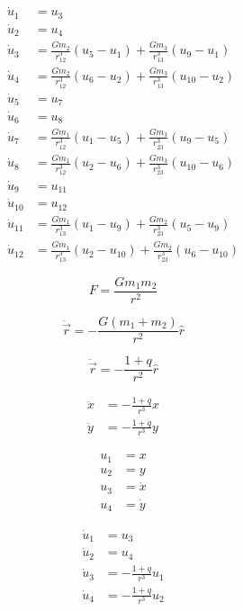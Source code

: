 \documentclass[a4paper,twoside,12pt,hidelinks]{article}
\begin{document}
\begin{align*}
  \dot{u}_1 &= u_3 \\
  \dot{u}_2 &= u_4 \\
  \dot{u}_3 &= \frac{G m_2}{r^3_{12}} (u_5 - u_1)  + \frac{G m_3}{r^3_{13}} (u_9 - u_1) \\
  \dot{u}_4 &= \frac{G m_2}{r^3_{12}} (u_6 - u_2)  + \frac{G m_3}{r^3_{13}} (u_{10} - u_2) \\
  \dot{u}_5 &= u_7 \\
  \dot{u}_6 &= u_8 \\
  \dot{u}_7 &= \frac{G m_1}{r^3_{12}} (u_1 - u_5)  + \frac{G m_3}{r^3_{23}} (u_9 - u_5) \\
  \dot{u}_8 &= \frac{G m_1}{r^3_{12}} (u_2 - u_6)  + \frac{G m_3}{r^3_{23}} (u_{10} - u_6) \\
  \dot{u}_9 &= u_{11} \\
  \dot{u}_{10} &= u_{12} \\
  \dot{u}_{11} &= \frac{G m_1}{r^3_{13}} (u_1 - u_9)  + \frac{G m_2}{r^3_{23}} (u_5 - u_9) \\
  \dot{u}_{12} &= \frac{G m_1}{r^3_{13}} (u_2 - u_{10})  + \frac{G m_2}{r^3_{23}} (u_6 - u_{10})
\end{align*}



\begin{equation*}
  F = \frac{G m_1 m_2}{r^2}
\end{equation*}


\begin{equation*}
  \ddot{\vec{r}} = - \frac{G (m_1 + m_2)}{r^2} \hat{r}
\end{equation*}

\begin{equation*}
  \ddot{\vec{r}} = - \frac{1 + q}{r^2} \hat{r}
\end{equation*}

\begin{align*}
  \ddot{x} &= - \frac{1 + q}{r^3} x \\
  \ddot{y} &= - \frac{1 + q}{r^3} y
\end{align*}


\begin{align*}
  u_1 &= x \\
  u_2 &= y \\
  u_3 &= \dot{x} \\
  u_4 &= \dot{y}
\end{align*}


\begin{align*}
  \dot{u}_1 &= u_3 \\
  \dot{u}_2 &= u_4 \\
  \dot{u}_3 &= - \frac{1 + q}{r^3} u_1 \\
  \dot{u}_4 &= - \frac{1 + q}{r^3} u_2
\end{align*}
\end{document}
